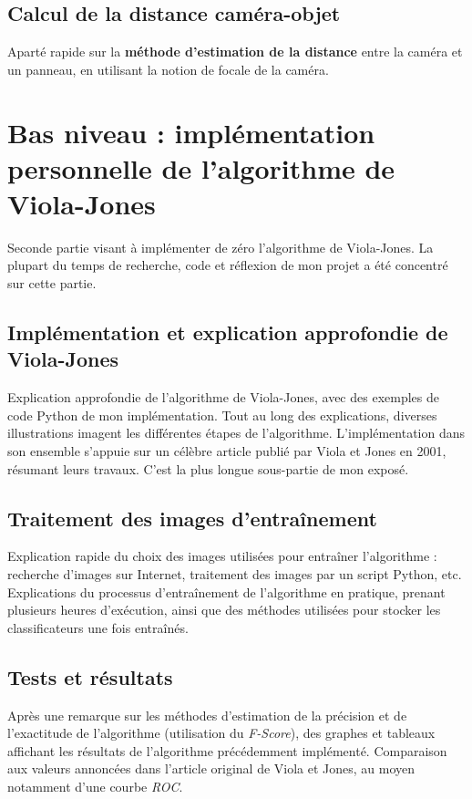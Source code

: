 \documentclass[12pt,a4paper]{article}
\begin{document}
\subsection{Calcul de la distance caméra-objet}
Aparté rapide sur la \textbf{méthode d'estimation de la distance} entre la caméra et un panneau, en utilisant la notion de focale de la caméra.


\section{Bas niveau : implémentation  personnelle de l’algorithme de Viola-Jones}
Seconde partie visant à implémenter de zéro l'algorithme de Viola-Jones. La plupart du temps de recherche, code et réflexion de mon projet a été concentré sur cette partie.

\subsection{Implémentation et explication approfondie de Viola-Jones}
Explication approfondie de l'algorithme de Viola-Jones, avec des exemples de code Python de mon implémentation. Tout au long des explications, diverses illustrations imagent les différentes étapes de l'algorithme. L'implémentation dans son ensemble s'appuie sur un célèbre article publié par Viola et Jones en 2001, résumant leurs travaux. C'est la plus longue sous-partie de mon exposé.

\subsection{Traitement des images d’entraînement}
Explication rapide du choix des images utilisées pour entraîner l'algorithme : recherche d'images sur Internet, traitement des images par un script Python, etc. \\

Explications du processus d'entraînement de l'algorithme en pratique, prenant plusieurs heures d'exécution, ainsi que des méthodes utilisées pour stocker les classificateurs une fois entraînés.

\subsection{Tests et résultats}
Après une remarque sur les méthodes d'estimation de la précision et de l'exactitude de l'algorithme (utilisation du \textit{F-Score}), des graphes et tableaux affichant les résultats de l'algorithme précédemment implémenté. Comparaison aux valeurs annoncées dans l'article original de Viola et Jones, au moyen notamment d'une courbe \textit{ROC}.
\end{document}
